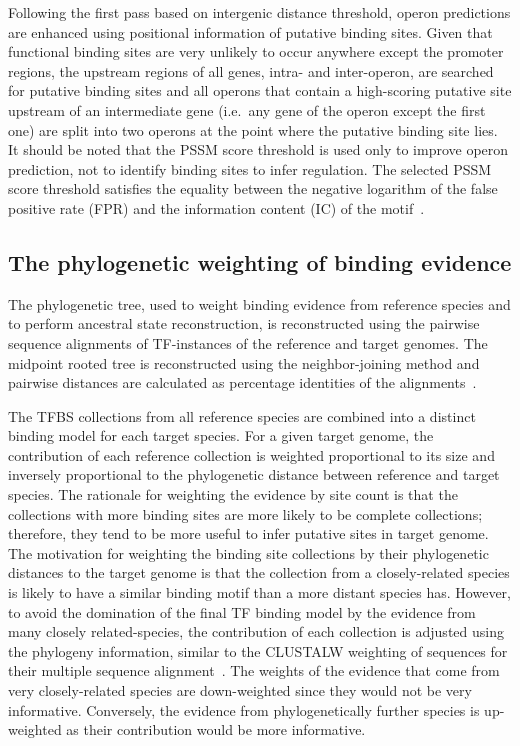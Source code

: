 \documentclass[12pt]{article}
\begin{document}
Following the first pass based on intergenic distance threshold, operon
predictions are enhanced using positional information of putative binding
sites. Given that functional binding sites are very unlikely to occur anywhere
except the promoter regions, the upstream regions of all genes, intra- and
inter-operon, are searched for putative binding sites and all operons that
contain a high-scoring putative site upstream of an intermediate gene (i.e.\
any gene of the operon except the first one) are split into two operons at the
point where the putative binding site lies. It should be noted that the PSSM
score threshold is used only to improve operon prediction, not to identify
binding sites to infer regulation. The selected PSSM score threshold satisfies
the equality between the negative logarithm of the false positive rate (FPR)
and the information content (IC) of the motif~\cite{hertz1999identifying}.

\subsection{The phylogenetic weighting of binding evidence}

The phylogenetic tree, used to weight binding evidence from reference species
and to perform ancestral state reconstruction, is reconstructed using the
pairwise sequence alignments of TF-instances of the reference and target
genomes. The midpoint rooted tree is reconstructed using the neighbor-joining
method and pairwise distances are calculated as percentage identities of the
alignments~\cite{saitou1987neighbor}.

The TFBS collections from all reference species are combined into a distinct
binding model for each target species. For a given target genome, the
contribution of each reference collection is weighted proportional to its size
and inversely proportional to the phylogenetic distance between reference and
target species. The rationale for weighting the evidence by site count is that
the collections with more binding sites are more likely to be complete
collections; therefore, they tend to be more useful to infer putative sites in
target genome. The motivation for weighting the binding site collections by
their phylogenetic distances to the target genome is that the collection from a
closely-related species is likely to have a similar binding motif than a more
distant species has. However, to avoid the domination of the final TF binding
model by the evidence from many closely related-species, the contribution of
each collection is adjusted using the phylogeny information, similar to the
CLUSTALW weighting of sequences for their multiple sequence
alignment~\cite{thompson1994clustal}. The weights of the evidence that come
from very closely-related species are down-weighted since they would not be
very informative. Conversely, the evidence from phylogenetically further
species is up-weighted as their contribution would be more informative.
\end{document}
